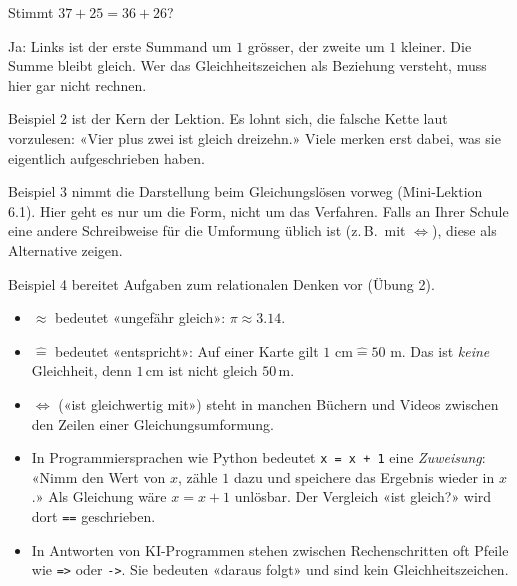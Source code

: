 \documentclass[11pt]{exam}
\begin{document}
\begin{beispiel}
Stimmt $37 + 25 = 36 + 26$?

Ja: Links ist der erste Summand um $1$ grösser, der zweite um $1$ kleiner. Die
Summe bleibt gleich. Wer das Gleichheitszeichen als Beziehung versteht, muss
hier gar nicht rechnen.
\end{beispiel}

\begin{lehrperson}[Beispiele]
Beispiel 2 ist der Kern der Lektion. Es lohnt sich, die falsche Kette laut
vorzulesen: «Vier plus zwei ist gleich dreizehn.» Viele merken erst dabei,
was sie eigentlich aufgeschrieben haben.

Beispiel 3 nimmt die Darstellung beim Gleichungslösen vorweg (Mini-Lektion
6.1). Hier geht es nur um die Form, nicht um das Verfahren. Falls an Ihrer
Schule eine andere Schreibweise für die Umformung üblich ist (z.\,B.\ mit
$\Leftrightarrow$), diese als Alternative zeigen.

Beispiel 4 bereitet Aufgaben zum relationalen Denken vor (Übung 2).
\end{lehrperson}


\begin{schreibweisen}
\begin{itemize}
  \item $\approx$ bedeutet «ungefähr gleich»: $\pi \approx 3.14$.
  \item $\widehat{=}$ bedeutet «entspricht»: Auf einer Karte gilt
        $1\text{ cm} \mathrel{\widehat{=}} 50\text{ m}$. Das ist \emph{keine}
        Gleichheit, denn $1$\,cm ist nicht gleich $50$\,m.
  \item $\Leftrightarrow$ («ist gleichwertig mit») steht in manchen Büchern und
        Videos zwischen den Zeilen einer Gleichungsumformung.
  \item In Programmiersprachen wie Python bedeutet \texttt{x = x + 1} eine
        \emph{Zuweisung}: «Nimm den Wert von $x$, zähle $1$ dazu und speichere
        das Ergebnis wieder in $x$.» Als Gleichung wäre $x = x + 1$ unlösbar.
        Der Vergleich «ist gleich?» wird dort \texttt{==} geschrieben.
  \item In Antworten von KI-Programmen stehen zwischen Rechenschritten oft
        Pfeile wie \texttt{=>} oder \texttt{->}. Sie bedeuten «daraus folgt»
        und sind kein Gleichheitszeichen.
\end{itemize}
\end{schreibweisen}
\end{document}
